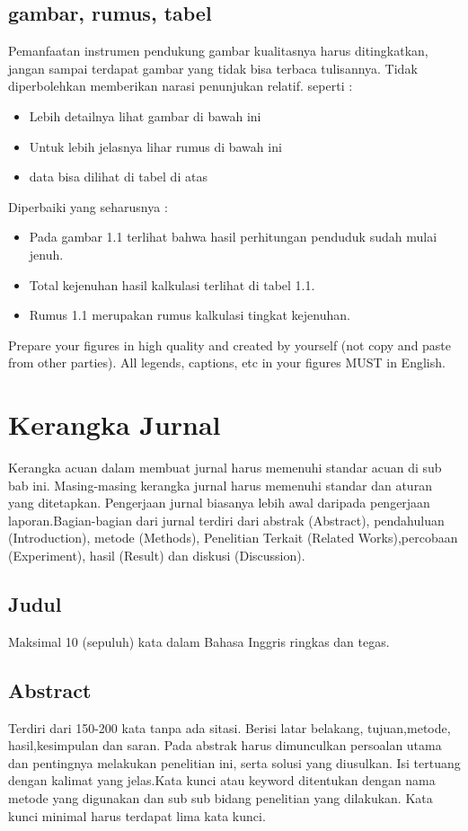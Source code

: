 \subsection{gambar, rumus, tabel}
Pemanfaatan instrumen pendukung gambar kualitasnya harus ditingkatkan, jangan sampai terdapat gambar yang tidak bisa terbaca tulisannya.
Tidak diperbolehkan memberikan narasi penunjukan relatif. seperti :
\begin{itemize}
	\item Lebih detailnya lihat gambar di bawah ini
	\item Untuk lebih jelasnya lihar rumus di bawah ini
	\item data bisa dilihat di tabel di atas
\end{itemize}
Diperbaiki yang seharusnya :
\begin{itemize}
	\item Pada gambar 1.1 terlihat bahwa hasil perhitungan penduduk sudah mulai jenuh.
	\item Total kejenuhan hasil kalkulasi terlihat di tabel 1.1.
	\item Rumus 1.1 merupakan rumus kalkulasi tingkat kejenuhan.
\end{itemize}
Prepare your figures in high quality and created by yourself (not copy and paste from other parties). All legends, captions, etc in your figures MUST in English.


\section{Kerangka Jurnal}
Kerangka acuan dalam membuat jurnal harus memenuhi standar acuan di sub bab ini. Masing-masing kerangka jurnal harus memenuhi standar dan aturan yang ditetapkan. Pengerjaan jurnal biasanya lebih awal daripada pengerjaan laporan.Bagian-bagian dari jurnal terdiri dari abstrak (Abstract), pendahuluan (Introduction), metode (Methods), Penelitian Terkait (Related Works),percobaan (Experiment), hasil (Result) dan diskusi (Discussion).

\subsection{Judul}
Maksimal 10 (sepuluh) kata dalam Bahasa Inggris ringkas dan tegas.

\subsection{Abstract}
Terdiri dari 150-200 kata tanpa ada sitasi. Berisi latar belakang, tujuan,metode, hasil,kesimpulan dan saran. Pada abstrak harus dimunculkan persoalan utama dan pentingnya melakukan penelitian ini, serta solusi yang diusulkan. Isi tertuang dengan kalimat yang jelas.Kata kunci atau keyword ditentukan dengan nama metode yang digunakan dan sub sub bidang penelitian yang dilakukan. Kata kunci minimal harus terdapat lima kata kunci.

